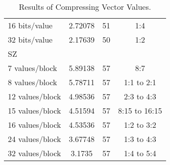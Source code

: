 \begin{table}
\begin{tabular}{l|S|r|c}
			\hspace{6mm} 16 bits/value & 2.72078 & 51 & 1:4 \\
			\hspace{6mm} 32 bits/value & 2.17639 & 50 & 1:2 \\
		SZ & & & \\
		\hspace{3mm} 7 values/block & 5.89138 & 57 & 8:7 \\
		\hspace{3mm} 8 values/block & 5.78711 & 57 & 1:1 to 2:1 \\
		\hspace{3mm} 12 values/block & 4.98536 & 57 & 2:3 to 4:3 \\
		\hspace{3mm} 15 values/block & 4.51594 & 57 & 8:15 to 16:15 \\
		\hspace{3mm} 16 values/block & 4.53536 & 57 & 1:2 to 3:2 \\
		\hspace{3mm} 24 values/block & 3.67748 & 57 & 1:3 to 4:3\\
		\hspace{3mm} 32 values/block & 3.1735 & 57 & 1:4 to 5:4\\
	\end{tabular}
	\caption{Results of Compressing Vector Values.}
	\label{tab:results-vec}
\end{table}
